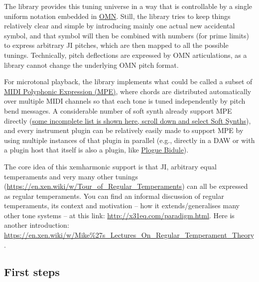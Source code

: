 \documentclass[11pt]{article}
\begin{document}
The library provides this tuning universe in a way that is controllable by a single uniform
notation embedded in \href{https://opusmodus.com/forums/tutorials/omn-the-language/}{OMN}. Still, the library tries to keep things relatively clear and simple by
introducing mainly one actual new accidental symbol, and that symbol will then be combined with
numbers (for prime limits) to express arbitrary JI pitches, which are then mapped to all the
possible tunings.  Technically, pitch deflections are expressed by OMN articulations, as a
library cannot change the underlying OMN pitch format.

For microtonal playback, the library implements what could be called a subset of \href{https://www.midi.org/midi-articles/midi-polyphonic-expression-mpe}{MIDI Polyphonic
Expression (MPE)}, where chords are distributed automatically over multiple MIDI channels so that
each tone is tuned independently by pitch bend messages. A considerable number of soft synth
already support MPE directly (\href{https://roli.com/mpe}{some incomplete list is shown here, scroll down and select Soft
Synths}), and every instrument plugin can be relatively easily made to support MPE by
using multiple instances of that plugin in parallel (e.g., directly in a DAW or with a plugin
host that itself is also a plugin, like \href{https://www.plogue.com/products/bidule.html}{Plogue Bidule}).


The core idea of this xemharmonic support is that JI, arbitrary equal temperaments and very many
other tunings (\url{https://en.xen.wiki/w/Tour\_of\_Regular\_Temperaments}) can all be expressed as
regular temperaments. You can find an informal discussion of regular temperaments, its context
and motivation -- how it extends/generalises many other tone systems -- at this link:
\url{http://x31eq.com/paradigm.html}. Here is another introduction: \url{https://en.xen.wiki/w/Mike\%27s\_Lectures\_On\_Regular\_Temperament\_Theory}. 


\subsection{First steps}
\label{sec:orgc1e7c9f}
\end{document}
